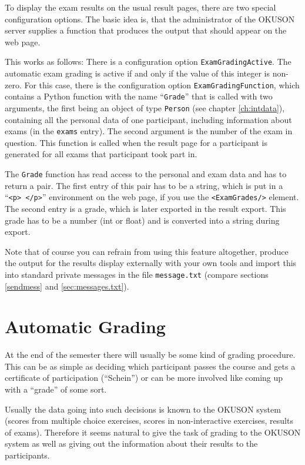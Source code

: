 \documentclass[12pt,openany,a4paper]{book}
\newcommand{\OKUSON}{\textsf{OKUSON}}
\begin{document}
To display the exam results on the usual result pages, there are two
special configuration options. The basic idea is, that the administrator of
the {\OKUSON} server supplies a function that produces the output that
should appear on the web page. 

This works as follows: There is a configuration option 
\texttt{ExamGradingActive}. The automatic exam grading is active if 
and only if the value of this integer is non-zero. For this case, there
is the configuration option \texttt{ExamGradingFunction}, which contains a
Python function with the name ``\texttt{Grade}'' that is called with
two arguments, the first being an object of type \texttt{Person} (see
chapter \ref{ch:intdata}), containing all the personal data of one
participant, including information about exams (in the \texttt{exams}
entry). The second argument is the number of the exam in question.
This function is called when the result page for a participant is
generated for all exams that participant took part in.

The \texttt{Grade} function has read access to the personal and exam data
and has to return a pair. The first entry of this pair has to be a string,
which is put in a ``\texttt{<p> </p>}'' environment on the web page, if you
use the \texttt{<ExamGrades/>} element. The
second entry is a grade, which is later exported in the result export.
This grade has to be a number (int or float) and is converted into a 
string during export.

Note that of course you can refrain from using this feature altogether,
produce the output for the results display externally with your own tools
and import this into standard private messages in the file \texttt{message.txt}
(compare sections \ref{sendmess} and \ref{sec:messages.txt}). 

\chapter{Automatic Grading}
\label{ch:autograde}

At the end of the semester there will usually be some kind of grading
procedure. This can be as simple as deciding which participant passes
the course and gets a certificate of participation (``Schein'') or can
be more involved like coming up with a ``grade'' of some sort. 

Usually the data going into such decisions is known to the {\OKUSON}
system (scores from multiple choice exercises, scores in non-interactive
exercises, results of exams). Therefore it seems natural to give the
task of grading to the {\OKUSON} system as well as giving out the
information about their results to the participants.
\end{document}
